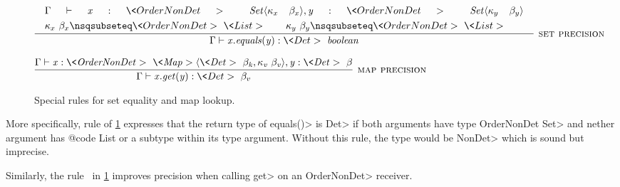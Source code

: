 \begin{figure}
    \begin{align*}
    \infer[\rulename{set precision}]{\Gamma \vdash \|x.equals(y)| : \<Det> \ \|boolean|}
    {
        &\Gamma \vdash \|x| : \<OrderNonDet> \ \|Set|\angles{ \kappa_{x} \ \beta_{x}}, \|y| : \<OrderNonDet> \ \|Set|\angles{ \kappa_{y} \ \beta_{y}} \hspace{10pt}\\
        & \kappa_{x} \ \beta_{x} \nsqsubseteq \<OrderNonDet> \ \<List> 
        \qquad \kappa_{y} \ \beta_{y} \nsqsubseteq \<OrderNonDet> \ \<List>     \hspace{30pt}
    }
    \end{align*}
    \bigskip
    
    $\infer[\rulename{map precision}]{\Gamma \vdash \|x.get(y)| : \<Det> \ \beta_v}{\Gamma \vdash \|x : \<OrderNonDet> \ \<Map>\angles{ \<Det> \ \beta_k, \kappa_v\ \beta_v }, y : \<Det> \ \beta|}$
    
    \caption{Special rules for set equality and map lookup.}
    \label{fig-precision-rules}
\end{figure}

More specifically, rule  of
\cref{fig-precision-rules} expresses that the return type of \<equals()>
is \<Det> if both arguments have type \<OrderNonDet Set> and nether argument
has {@code List} or a subtype within its type argument.
Without this rule, the type would be \<NonDet> which is sound but imprecise.

Similarly, the rule \ in \cref{fig-precision-rules}
improves precision when calling \<get> on an \<OrderNonDet> receiver.


